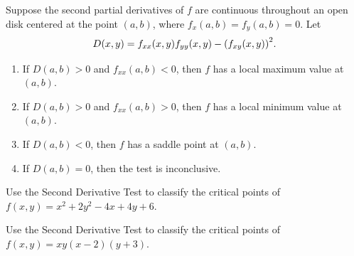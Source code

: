 \documentclass[../mathNotesPreamble]{subfiles}
\begin{document}
  \begin{thmBox*}
    Suppose the second partial derivatives of $f$ are continuous throughout an open disk centered at the point $(a,b)$, where $f_x(a,b)=f_y(a,b)=0$. Let 
      \[D(x,y)=f_{xx}(x,y) f_{yy}(x,y)-{\left(f_{xy}(x,y)\right)}^2.\]
    \begin{enumerate}
      \item 
        If $D(a,b) > 0$ and $f_{xx}(a,b) < 0$, then $f$ has a local maximum value at $(a,b)$.
      \item 
        If $D(a,b) > 0$ and $f_{xx}(a,b) > 0$, then $f$ has a local minimum value at $(a,b)$.
      \item 
        If $D(a,b) <0$, then $f$ has a saddle point at $(a,b)$.
      \item 
        If $D(a,b)=0$, then the test is inconclusive.
    \end{enumerate}
  \end{thmBox*}
  \pagebreak

  \begin{ex*}
    Use the Second Derivative Test to classify the critical points of \newline
    $f(x,y)=x^2+2y^2-4x+4y+6$.
  \end{ex*}

  \begin{ex*}
    Use the Second Derivative Test to classify the critical points of \newline
    $f(x,y)=xy(x-2)(y+3)$.
  \end{ex*}
  \pagebreak
\end{document}
